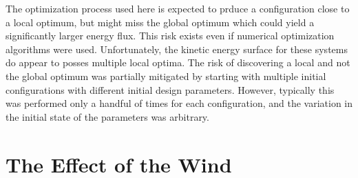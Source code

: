 %
%

The optimization process used here is expected to prduce a configuration 
close to a local optimum, but might miss the global optimum 
which could yield a
significantly larger energy flux. This risk exists even if
numerical optimization algorithms were used. Unfortunately, the kinetic
energy surface for these systems do appear to posses multiple local
optima.
The risk of discovering a local 
and not the global optimum was partially mitigated by starting
with multiple initial configurations with different initial
design parameters. However, typically this was performed only a handful of
times for each configuration, and the variation in the initial state of
the parameters was arbitrary. 

\section{The Effect of the Wind}
\label{sec:wind_impact}


